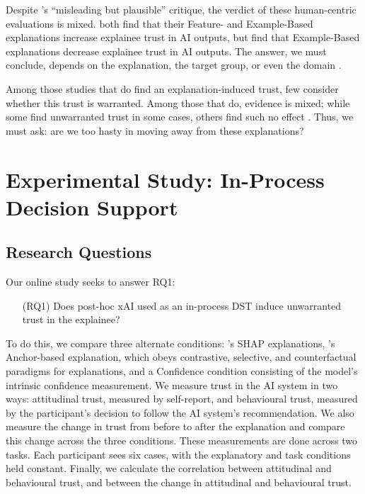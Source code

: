 Despite \textcite{Lipton}'s ``misleading but plausible'' critique, the verdict of these human-centric evaluations is mixed. \textcite{lai_human_2019,jacobs_how_2021} both find that their Feature- and Example-Based explanations increase explainee trust in AI outputs, but \textcite{binns_its_2018} find that Example-Based explanations decrease explainee trust in AI outputs. The answer, we must conclude, depends on the explanation, the target group, or even the domain \cite{mohseni_trust_nodate}. 

Among those studies that do find an explanation-induced trust, few consider whether this trust is warranted. Among those that do, evidence is mixed; while some find unwarranted trust in some cases, others find such no effect \cite{lai_human_2019,jacobs_how_2021}. Thus, we must ask: are we too hasty in moving away from these explanations? 

\section[Experimental Study]{Experimental Study: In-Process Decision Support}\label{sec:online}
\subsection{Research Questions}
Our online study seeks to answer RQ1:

\begin{enumerate}
    \item[(RQ1)] Does post-hoc xAI used as an in-process DST induce unwarranted trust in the explainee?
\end{enumerate}

To do this, we compare three alternate conditions: \textcite{lundberg_unified_2017}'s SHAP explanations, \textcite{ribeiro_anchors_2018}'s Anchor-based explanation, which obeys contrastive, selective, and counterfactual paradigms for explanations, and a Confidence condition consisting of the model's intrinsic confidence measurement. We measure trust in the AI system in two ways: attitudinal trust, measured by self-report, and behavioural trust, measured by the participant's decision to follow the AI system's recommendation. We also measure the change in trust from before to after the explanation and compare this change across the three conditions. These measurements are done across two tasks. Each participant sees six cases, with the explanatory and task conditions held constant. Finally, we calculate the correlation between attitudinal and behavioural trust, and between the change in attitudinal and behavioural trust.


